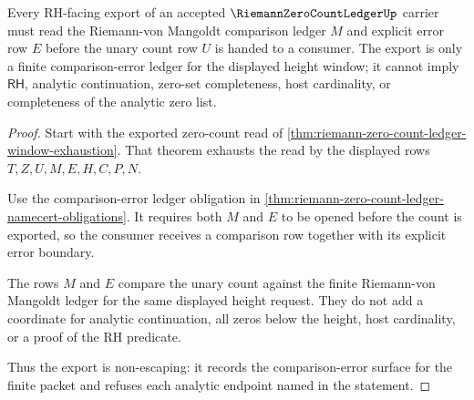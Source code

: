 \begin{theorem}
\label{thm:riemann-zero-count-ledger-comparison-error-nonescape}
Every RH-facing export of an accepted $\RiemannZeroCountLedgerUp$ carrier must read the Riemann-von Mangoldt comparison ledger $M$ and explicit error row $E$ before the unary count row $U$ is handed to a consumer. The export is only a finite comparison-error ledger for the displayed height window; it cannot imply $\mathsf{RH}$, analytic continuation, zero-set completeness, host cardinality, or completeness of the analytic zero list.
\end{theorem}
\begin{proof}
Start with the exported zero-count read of \autoref{thm:riemann-zero-count-ledger-window-exhaustion}. That theorem exhausts the read by the displayed rows $T,Z,U,M,E,H,C,P,N$.

Use the comparison-error ledger obligation in \autoref{thm:riemann-zero-count-ledger-namecert-obligations}. It requires both $M$ and $E$ to be opened before the count is exported, so the consumer receives a comparison row together with its explicit error boundary.

The rows $M$ and $E$ compare the unary count against the finite Riemann-von Mangoldt ledger for the same displayed height request. They do not add a coordinate for analytic continuation, all zeros below the height, host cardinality, or a proof of the RH predicate.

Thus the export is non-escaping: it records the comparison-error surface for the finite packet and refuses each analytic endpoint named in the statement.
\end{proof}

